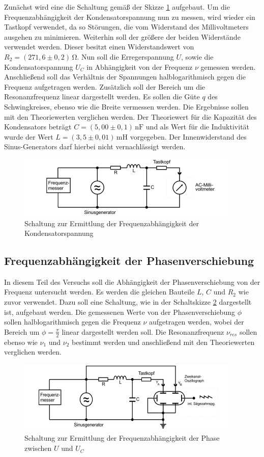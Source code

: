 Zunächst wird eine die Schaltung gemäß der Skizze \ref{fig:gsk4} aufgebaut. Um die Frequenzabhängigkeit 
der Kondensatorspannung nun zu messen, wird wieder ein Tastkopf verwendet, da so Störungen, die vom Widerstand
des Millivoltmeters ausgehen zu minimieren. Weiterhin soll der größere der beiden Widerstände verwendet werden. Dieser 
besitzt einen Widerstandswert von $R_2 = (271,6 \pm 0,2)\, \si{\ohm}$. 
Nun soll die Erregerspannung $U$, sowie die Kondensatorspannung $U_C$ in Abhängigkeit von der Frequenz $\nu$
gemessen werden. Anschließend soll das Verhältnis der Spannungen halblogarithmisch gegen die Frequenz aufgetragen werden.
Zusätzlich soll der Bereich um die Resonanzfrequenz linear dargestellt werden. Es sollen die Güte $q$ des
Schwingkreises, ebenso wie die Breite vermessen werden. Die Ergebnisse sollen mit den Theoriewerten 
verglichen werden. Der Theoriewert für die Kapazität des Kondensators beträgt $C = (5,00 \pm 0,1)\, \si{\nano\farad}$
und als Wert für die Induktivität wurde der Wert $L = (3,5 \pm 0,01)\, \si{\milli\henry}$ vorgegeben.
Der Innenwiderstand des Sinus-Generators darf hierbei nicht vernachlässigt werden.

\begin{figure}[H]
  \centering
  \includegraphics{content/aufgabeC.png}
  \caption{Schaltung zur Ermittlung der Frequenzabhängigkeit der Kondensatorspannung \cite{sample354}}
  \label{fig:gsk4}
\end{figure}


\subsection{Frequenzabhängigkeit der Phasenverschiebung}

In diesem Teil des Versuchs soll die Abhängigkeit der Phasenverschiebung von der Frequenz untersucht werden.
Es werden die gleichen Bauteile $L$, $C$ und $R_2$ wie zuvor verwendet.  
Dazu soll eine Schaltung, wie in der Schaltskizze \ref{fig:gsk5} dargestellt ist, aufgebaut werden.
Die gemessenen Werte von der Phasenverschiebung $\phi$ sollen halblogarithmisch gegen die Frequenz $\nu$
aufgetragen werden, wobei der Bereich um $\phi = \frac{\pi}{2}$ linear dargestellt werden soll.
Die Resonanzfrequenz $\nu_{res}$ sollen ebenso wie $\nu_1$ und $\nu_2$ bestimmt werden und anschließend
mit den Theoriewerten verglichen werden. 

\begin{figure}[H]
  \centering
  \includegraphics{content/aufgabeD.png}
  \caption{Schaltung zur Ermittlung der Frequenzabhängigkeit der Phase zwischen $U$ und $U_C$ \cite{sample354}}
  \label{fig:gsk5}
\end{figure}
